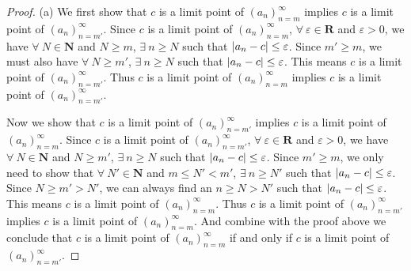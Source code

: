 \begin{proof}{(a)}
    We first show that \(c\) is a limit point of \((a_n)_{n = m}^\infty\) implies \(c\) is a limit point of \((a_n)_{n = m'}^\infty\).
    Since \(c\) is a limit point of \((a_n)_{n = m}^\infty\), \(\forall\ \varepsilon \in \mathbf{R}\) and \(\varepsilon > 0\), we have \(\forall\ N \in \mathbf{N}\) and \(N \geq m\), \(\exists\ n \geq N\) such that \(\abs*{a_n - c} \leq \varepsilon\).
    Since \(m' \geq m\), we must also have \(\forall\ N \geq m'\), \(\exists\ n \geq N\) such that \(\abs*{a_n - c} \leq \varepsilon\).
    This means \(c\) is a limit point of \((a_n)_{n = m'}^\infty\).
    Thus \(c\) is a limit point of \((a_n)_{n = m}^\infty\) implies \(c\) is a limit point of \((a_n)_{n = m'}^\infty\).

    Now we show that \(c\) is a limit point of \((a_n)_{n = m'}^\infty\) implies \(c\) is a limit point of \((a_n)_{n = m}^\infty\).
    Since \(c\) is a limit point of \((a_n)_{n = m'}^\infty\), \(\forall\ \varepsilon \in \mathbf{R}\) and \(\varepsilon > 0\), we have \(\forall\ N \in \mathbf{N}\) and \(N \geq m'\), \(\exists\ n \geq N\) such that \(\abs*{a_n - c} \leq \varepsilon\).
    Since \(m' \geq m\), we only need to show that \(\forall\ N' \in \mathbf{N}\) and \(m \leq N' < m'\), \(\exists\ n \geq N'\) such that \(\abs*{a_n - c} \leq \varepsilon\).
    Since \(N \geq m' > N'\), we can always find an \(n \geq N > N'\) such that \(\abs*{a_n - c} \leq \varepsilon\).
    This means \(c\) is a limit point of \((a_n)_{n = m}^\infty\).
    Thus \(c\) is a limit point of \((a_n)_{n = m'}^\infty\) implies \(c\) is a limit point of \((a_n)_{n = m}^\infty\).
    And combine with the proof above we conclude that \(c\) is a limit point of \((a_n)_{n = m}^\infty\) if and only if \(c\) is a limit point of \((a_n)_{n = m'}^\infty\).
\end{proof}

